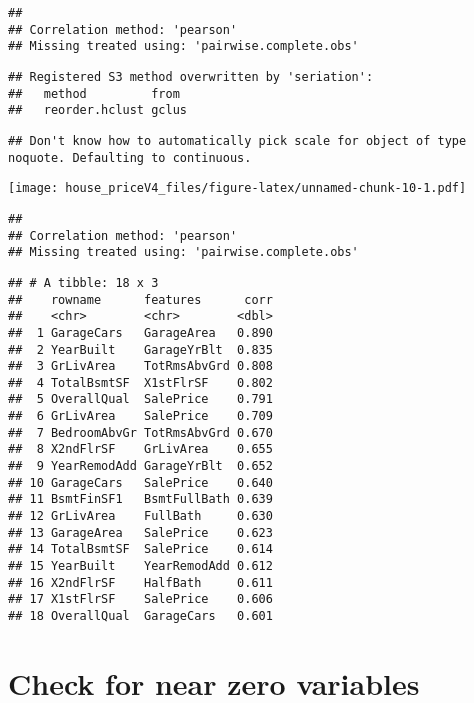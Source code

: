 \documentclass[
]{article}
\newenvironment{Shaded}{\begin{snugshade}}{\end{snugshade}}
\newcommand{\DataTypeTok}[1]{\textcolor[rgb]{0.13,0.29,0.53}{#1}}
\newcommand{\FloatTok}[1]{\textcolor[rgb]{0.00,0.00,0.81}{#1}}
\newcommand{\KeywordTok}[1]{\textcolor[rgb]{0.13,0.29,0.53}{\textbf{#1}}}
\newcommand{\NormalTok}[1]{#1}
\newcommand{\OperatorTok}[1]{\textcolor[rgb]{0.81,0.36,0.00}{\textbf{#1}}}
\newcommand{\StringTok}[1]{\textcolor[rgb]{0.31,0.60,0.02}{#1}}
\begin{document}
\begin{verbatim}
## 
## Correlation method: 'pearson'
## Missing treated using: 'pairwise.complete.obs'
\end{verbatim}

\begin{verbatim}
## Registered S3 method overwritten by 'seriation':
##   method         from 
##   reorder.hclust gclus
\end{verbatim}

\begin{verbatim}
## Don't know how to automatically pick scale for object of type noquote. Defaulting to continuous.
\end{verbatim}

\texttt{[image: house\_priceV4\_files/figure-latex/unnamed-chunk-10-1.pdf]}

\begin{Shaded}
\end{Shaded}

\begin{verbatim}
## 
## Correlation method: 'pearson'
## Missing treated using: 'pairwise.complete.obs'
\end{verbatim}

\begin{verbatim}
## # A tibble: 18 x 3
##    rowname      features      corr
##    <chr>        <chr>        <dbl>
##  1 GarageCars   GarageArea   0.890
##  2 YearBuilt    GarageYrBlt  0.835
##  3 GrLivArea    TotRmsAbvGrd 0.808
##  4 TotalBsmtSF  X1stFlrSF    0.802
##  5 OverallQual  SalePrice    0.791
##  6 GrLivArea    SalePrice    0.709
##  7 BedroomAbvGr TotRmsAbvGrd 0.670
##  8 X2ndFlrSF    GrLivArea    0.655
##  9 YearRemodAdd GarageYrBlt  0.652
## 10 GarageCars   SalePrice    0.640
## 11 BsmtFinSF1   BsmtFullBath 0.639
## 12 GrLivArea    FullBath     0.630
## 13 GarageArea   SalePrice    0.623
## 14 TotalBsmtSF  SalePrice    0.614
## 15 YearBuilt    YearRemodAdd 0.612
## 16 X2ndFlrSF    HalfBath     0.611
## 17 X1stFlrSF    SalePrice    0.606
## 18 OverallQual  GarageCars   0.601
\end{verbatim}

\hypertarget{check-for-near-zero-variables}{%
\section{Check for near zero
variables}\label{check-for-near-zero-variables}}
\end{document}
